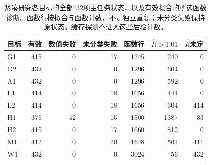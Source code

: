 \begin{table}[htbp]\centering\small
\begin{tabular}{lrrrrrr}\toprule
目标 & 有效 & 数值失败 & 未分类失败 & 函数行 & $\hat R>1.01$ & $\hat R$未定\\\midrule
G1 & 415 & 0 & 17 & 1245 & 240 & 0\\
G2 & 432 & 0 & 0 & 1296 & 604 & 0\\
A1 & 432 & 0 & 0 & 1296 & 592 & 0\\
L1 & 414 & 0 & 18 & 1656 & 444 & 0\\
L2 & 414 & 0 & 18 & 1656 & 304 & 414\\
H1 & 375 & 42 & 15 & 1500 & 1387 & 33\\
H2 & 415 & 0 & 17 & 1660 & 812 & 0\\
M1 & 412 & 0 & 20 & 1648 & 561 & 411\\
W1 & 432 & 0 & 0 & 3024 & 56 & 432\\
\bottomrule\end{tabular}
\caption{紧凑研究各目标的全部432项主任务状态，以及有效拟合的所选函数诊断。函数行按拟合与函数计数，不是独立重复；未分类失败保持原状态。缓存探测不进入这些后验计数。}
\label{tab:compact-outcomes}
\end{table}
